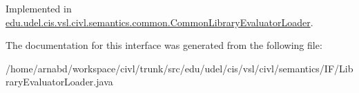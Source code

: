 Implemented in \hyperlink{classedu_1_1udel_1_1cis_1_1vsl_1_1civl_1_1semantics_1_1common_1_1CommonLibraryEvaluatorLoader_ab5462fb8a6d49df3bea4ff07fc1a6f86}{edu.\+udel.\+cis.\+vsl.\+civl.\+semantics.\+common.\+Common\+Library\+Evaluator\+Loader}.



The documentation for this interface was generated from the following file\+:\begin{DoxyCompactItemize}
\item 
/home/arnabd/workspace/civl/trunk/src/edu/udel/cis/vsl/civl/semantics/\+I\+F/Library\+Evaluator\+Loader.\+java\end{DoxyCompactItemize}
